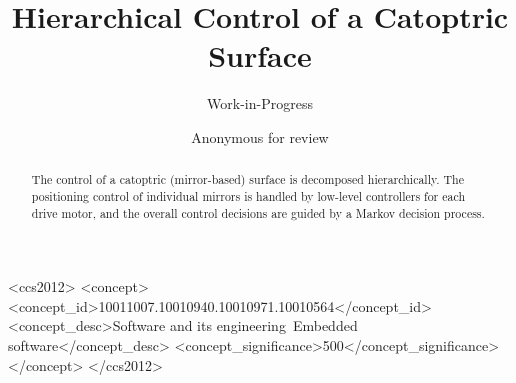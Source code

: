 \documentclass[sigconf]{acmart}
\begin{document}
\title{Hierarchical Control of a Catoptric Surface}
\subtitle{Work-in-Progress}


\author{Anonymous for review}
\email{[Email]}


\renewcommand{\shortauthors}{Anonymous for review}


\begin{abstract}
The control of a catoptric (mirror-based) surface is decomposed
hierarchically. The positioning control of individual mirrors
is handled by low-level controllers for each drive motor, and the
overall control decisions are guided by a Markov decision process.
\end{abstract}

%
%
\begin{CCSXML}
<ccs2012>
<concept>
<concept_id>10011007.10010940.10010971.10010564</concept_id>
<concept_desc>Software and its engineering~Embedded software</concept_desc>
<concept_significance>500</concept_significance>
</concept>
</ccs2012>
\end{CCSXML}





\maketitle








\end{document}

